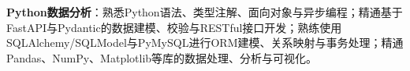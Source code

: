 \item \textbf{Python数据分析}：熟悉Python语法、类型注解、面向对象与异步编程；精通基于FastAPI与Pydantic的数据建模、校验与RESTful接口开发；熟练使用SQLAlchemy/SQLModel与PyMySQL进行ORM建模、关系映射与事务处理；精通Pandas、NumPy、Matplotlib等库的数据处理、分析与可视化。